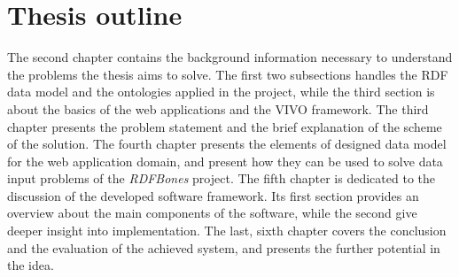 \section{Thesis outline}

The second chapter contains the background information necessary to understand the problems the thesis aims to solve. The first two subsections handles the RDF data model and the ontologies applied in the project, while the third section is about the basics of the web applications and the VIVO framework. The third chapter presents the problem statement and the brief explanation of the scheme of the solution. The fourth chapter presents the elements of designed data model for the web application domain, and present how they can be used to solve data input problems of the \textit{RDFBones} project. The fifth chapter is dedicated to the discussion of the developed software framework. Its first section provides an overview about the main components of the software, while the second give deeper insight into implementation. The last, sixth chapter covers the conclusion and the evaluation of the achieved system, and presents the further potential in the idea.
